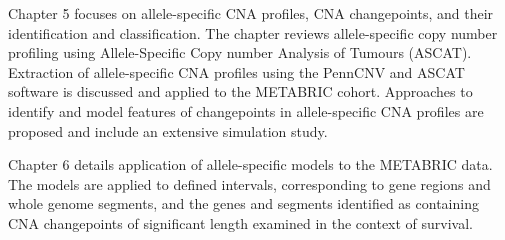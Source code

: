 Chapter 5 focuses on allele-specific CNA profiles, CNA changepoints, and their identification and classification. The chapter reviews allele-specific copy number profiling using Allele-Specific Copy number Analysis of Tumours (ASCAT). Extraction of allele-specific CNA profiles using the PennCNV and ASCAT software is discussed and applied to the METABRIC cohort. Approaches to identify and model features of changepoints in allele-specific CNA profiles are proposed and include an extensive simulation study. 

Chapter 6 details application of allele-specific models to the METABRIC data. The models are applied to defined intervals, corresponding to gene regions and whole genome segments, and the genes and segments identified as containing CNA changepoints of significant length examined in the context of survival.  